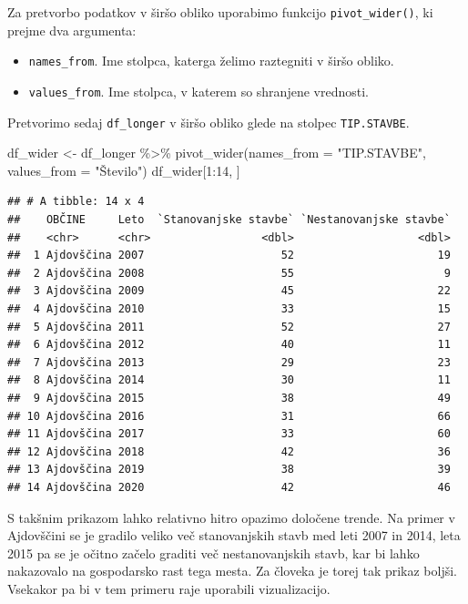 \documentclass[
]{book}
\newenvironment{Shaded}{\begin{snugshade}}{\end{snugshade}}
\newcommand{\AttributeTok}[1]{\textcolor[rgb]{0.77,0.63,0.00}{#1}}
\newcommand{\DecValTok}[1]{\textcolor[rgb]{0.00,0.00,0.81}{#1}}
\newcommand{\FunctionTok}[1]{\textcolor[rgb]{0.00,0.00,0.00}{#1}}
\newcommand{\NormalTok}[1]{#1}
\newcommand{\OtherTok}[1]{\textcolor[rgb]{0.56,0.35,0.01}{#1}}
\newcommand{\SpecialCharTok}[1]{\textcolor[rgb]{0.00,0.00,0.00}{#1}}
\newcommand{\StringTok}[1]{\textcolor[rgb]{0.31,0.60,0.02}{#1}}
\providecommand{\tightlist}{%
  \setlength{\itemsep}{0pt}\setlength{\parskip}{0pt}}
\begin{document}
Za pretvorbo podatkov v širšo obliko uporabimo funkcijo \texttt{pivot\_wider()}, ki prejme dva argumenta:

\begin{itemize}
\tightlist
\item
  \texttt{names\_from}. Ime stolpca, katerga želimo raztegniti v širšo obliko.
\item
  \texttt{values\_from}. Ime stolpca, v katerem so shranjene vrednosti.
\end{itemize}

Pretvorimo sedaj \texttt{df\_longer} v širšo obliko glede na stolpec \texttt{TIP.STAVBE}.

\begin{Shaded}
\begin{Highlighting}[]
\NormalTok{df\_wider }\OtherTok{\textless{}{-}}\NormalTok{ df\_longer }\SpecialCharTok{\%\textgreater{}\%}
  \FunctionTok{pivot\_wider}\NormalTok{(}\AttributeTok{names\_from =} \StringTok{"TIP.STAVBE"}\NormalTok{, }\AttributeTok{values\_from =} \StringTok{"Število"}\NormalTok{)}
\NormalTok{df\_wider[}\DecValTok{1}\SpecialCharTok{:}\DecValTok{14}\NormalTok{, ]}
\end{Highlighting}
\end{Shaded}

\begin{verbatim}
## # A tibble: 14 x 4
##    OBČINE     Leto  `Stanovanjske stavbe` `Nestanovanjske stavbe`
##    <chr>      <chr>                 <dbl>                   <dbl>
##  1 Ajdovščina 2007                     52                      19
##  2 Ajdovščina 2008                     55                       9
##  3 Ajdovščina 2009                     45                      22
##  4 Ajdovščina 2010                     33                      15
##  5 Ajdovščina 2011                     52                      27
##  6 Ajdovščina 2012                     40                      11
##  7 Ajdovščina 2013                     29                      23
##  8 Ajdovščina 2014                     30                      11
##  9 Ajdovščina 2015                     38                      49
## 10 Ajdovščina 2016                     31                      66
## 11 Ajdovščina 2017                     33                      60
## 12 Ajdovščina 2018                     42                      36
## 13 Ajdovščina 2019                     38                      39
## 14 Ajdovščina 2020                     42                      46
\end{verbatim}

S takšnim prikazom lahko relativno hitro opazimo določene trende. Na primer v Ajdovščini se je gradilo veliko več stanovanjskih stavb med leti 2007 in 2014, leta 2015 pa se je očitno začelo graditi več nestanovanjskih stavb, kar bi lahko nakazovalo na gospodarsko rast tega mesta. Za človeka je torej tak prikaz boljši. Vsekakor pa bi v tem primeru raje uporabili vizualizacijo.
\end{document}
